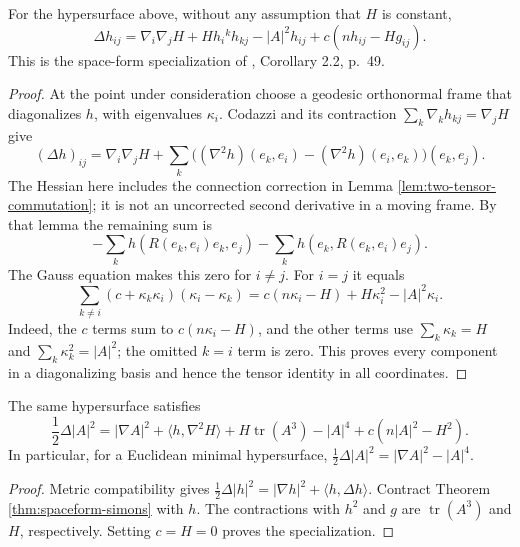 \begin{theorem}\label{thm:spaceform-simons}
For the hypersurface above, without any assumption that $H$ is constant,
\[
 \Delta h_{ij}=\nabla_i\nabla_jH+Hh_i{}^kh_{kj}-|A|^2h_{ij}
                 +c(nh_{ij}-Hg_{ij}).
\]
This is the space-form specialization of \cite{HP99}, Corollary 2.2, p.~49.
\end{theorem}
\begin{proof}
At the point under consideration choose a geodesic orthonormal frame that diagonalizes $h$, with eigenvalues $\kappa_i$. Codazzi and its contraction $\sum_k\nabla_kh_{kj}=\nabla_jH$ give
\[
 (\Delta h)_{ij}=\nabla_i\nabla_jH
 +\sum_k\bigl((\nabla^2h)(e_k,e_i)-(\nabla^2h)(e_i,e_k)\bigr)(e_k,e_j).
\]
The Hessian here includes the connection correction in Lemma \ref{lem:two-tensor-commutation}; it is not an uncorrected second derivative in a moving frame. By that lemma the remaining sum is
\[
 -\sum_k h(R(e_k,e_i)e_k,e_j)-\sum_kh(e_k,R(e_k,e_i)e_j).
\]
The Gauss equation makes this zero for $i\ne j$. For $i=j$ it equals
\[
 \sum_{k\ne i}(c+\kappa_k\kappa_i)(\kappa_i-\kappa_k)
 =c(n\kappa_i-H)+H\kappa_i^2-|A|^2\kappa_i.
\]
Indeed, the $c$ terms sum to $c(n\kappa_i-H)$, and the other terms use $\sum_k\kappa_k=H$ and $\sum_k\kappa_k^2=|A|^2$; the omitted $k=i$ term is zero. This proves every component in a diagonalizing basis and hence the tensor identity in all coordinates.
\end{proof}

\begin{corollary}\label{cor:simons-norm-variable}
The same hypersurface satisfies
\[
 \frac12\Delta|A|^2=|\nabla A|^2+\langle h,\nabla^2H\rangle
 +H\operatorname{tr}(A^3)-|A|^4+c(n|A|^2-H^2).
\]
In particular, for a Euclidean minimal hypersurface,
$\frac12\Delta|A|^2=|\nabla A|^2-|A|^4$.
\end{corollary}
\begin{proof}
Metric compatibility gives $\frac12\Delta|h|^2=|\nabla h|^2+\langle h,\Delta h\rangle$. Contract Theorem \ref{thm:spaceform-simons} with $h$. The contractions with $h^2$ and $g$ are $\operatorname{tr}(A^3)$ and $H$, respectively. Setting $c=H=0$ proves the specialization.
\end{proof}

